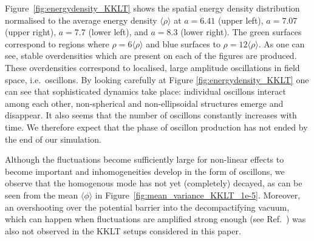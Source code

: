 \documentclass[12pt]{article}
\begin{document}
Figure~\ref{fig:energydensity_KKLT} shows the spatial energy density distribution normalised to the average energy density $\langle\rho\rangle$ at $a=6.41$ (upper left), $a=7.07$ (upper right), $a=7.7$ (lower left), and $a=8.3$ (lower right). The green surfaces correspond to regions where $\rho = 6\langle\rho\rangle$ and blue surfaces to $\rho = 12\langle\rho\rangle$. As one can see, stable overdensities which are present on each of the figures are produced. These overdensities correspond to localised, large amplitude oscillations in field space, i.e.\ oscillons. By looking carefully at Figure \ref{fig:energydensity_KKLT} one can see that sophisticated dynamics take place: individual oscillons interact among each other, non-spherical and non-ellipsoidal structures emerge and disappear. It also seems that the number of oscillons constantly increases with time. We therefore expect that the phase of oscillon production has not ended by the end of our simulation.

Although the fluctuations become sufficiently large for non-linear effects to become important and inhomogeneities develop in the form of oscillons, we observe that the homogenous mode has not yet (completely) decayed, as can be seen from the mean $\langle\phi\rangle$ in Figure~\ref{fig:mean_variance_KKLT_1e-5}. Moreover, an overshooting over the potential barrier into the decompactifying vacuum, which can happen when fluctuations are amplified strong enough (see Ref.~\cite{Antusch:2015nla}) was also not observed in the KKLT setups considered in this paper. 
\end{document}
